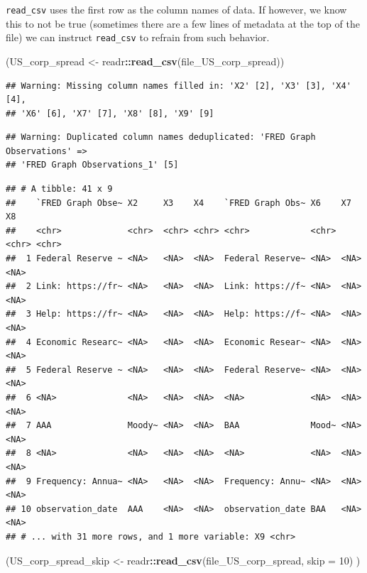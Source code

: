 \documentclass[12pt,]{article}
\newenvironment{Shaded}{\begin{snugshade}}{\end{snugshade}}
\newcommand{\KeywordTok}[1]{\textcolor[rgb]{0.13,0.29,0.53}{\textbf{#1}}}
\newcommand{\DataTypeTok}[1]{\textcolor[rgb]{0.13,0.29,0.53}{#1}}
\newcommand{\DecValTok}[1]{\textcolor[rgb]{0.00,0.00,0.81}{#1}}
\newcommand{\StringTok}[1]{\textcolor[rgb]{0.31,0.60,0.02}{#1}}
\newcommand{\OperatorTok}[1]{\textcolor[rgb]{0.81,0.36,0.00}{\textbf{#1}}}
\newcommand{\NormalTok}[1]{#1}
\begin{document}
\texttt{read\_csv} uses the first row as the column names of data. If
however, we know this to not be true (sometimes there are a few lines of
metadata at the top of the file) we can instruct \texttt{read\_csv} to
refrain from such behavior.

\begin{Shaded}
\begin{Highlighting}[]
\NormalTok{(US_corp_spread <-}\StringTok{ }\NormalTok{readr}\OperatorTok{::}\KeywordTok{read_csv}\NormalTok{(file_US_corp_spread))}
\end{Highlighting}
\end{Shaded}

\begin{verbatim}
## Warning: Missing column names filled in: 'X2' [2], 'X3' [3], 'X4' [4],
## 'X6' [6], 'X7' [7], 'X8' [8], 'X9' [9]
\end{verbatim}

\begin{verbatim}
## Warning: Duplicated column names deduplicated: 'FRED Graph Observations' =>
## 'FRED Graph Observations_1' [5]
\end{verbatim}

\begin{verbatim}
## # A tibble: 41 x 9
##    `FRED Graph Obse~ X2     X3    X4    `FRED Graph Obs~ X6    X7    X8   
##    <chr>             <chr>  <chr> <chr> <chr>            <chr> <chr> <chr>
##  1 Federal Reserve ~ <NA>   <NA>  <NA>  Federal Reserve~ <NA>  <NA>  <NA> 
##  2 Link: https://fr~ <NA>   <NA>  <NA>  Link: https://f~ <NA>  <NA>  <NA> 
##  3 Help: https://fr~ <NA>   <NA>  <NA>  Help: https://f~ <NA>  <NA>  <NA> 
##  4 Economic Researc~ <NA>   <NA>  <NA>  Economic Resear~ <NA>  <NA>  <NA> 
##  5 Federal Reserve ~ <NA>   <NA>  <NA>  Federal Reserve~ <NA>  <NA>  <NA> 
##  6 <NA>              <NA>   <NA>  <NA>  <NA>             <NA>  <NA>  <NA> 
##  7 AAA               Moody~ <NA>  <NA>  BAA              Mood~ <NA>  <NA> 
##  8 <NA>              <NA>   <NA>  <NA>  <NA>             <NA>  <NA>  <NA> 
##  9 Frequency: Annua~ <NA>   <NA>  <NA>  Frequency: Annu~ <NA>  <NA>  <NA> 
## 10 observation_date  AAA    <NA>  <NA>  observation_date BAA   <NA>  <NA> 
## # ... with 31 more rows, and 1 more variable: X9 <chr>
\end{verbatim}

\begin{Shaded}
\begin{Highlighting}[]
\NormalTok{(US_corp_spread_skip <-}\StringTok{ }\NormalTok{readr}\OperatorTok{::}\KeywordTok{read_csv}\NormalTok{(file_US_corp_spread, }
                                        \DataTypeTok{skip =} \DecValTok{10}\NormalTok{)}
\NormalTok{  )}
\end{Highlighting}
\end{Shaded}
\end{document}
